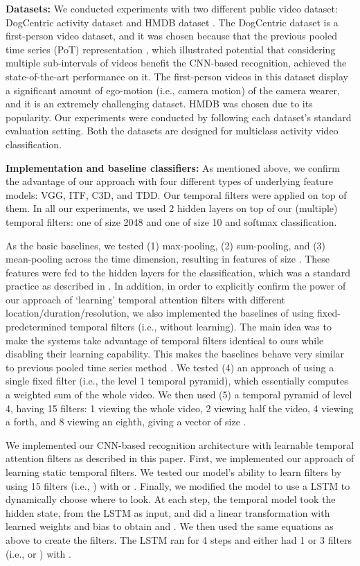 \documentclass[letterpaper]{article}
\begin{document}
{\flushleft\textbf{Datasets:} We conducted experiments with two different public video dataset: DogCentric activity dataset \cite{ryoo14dog} and HMDB dataset \cite{kuehne11}. The DogCentric dataset is a first-person video dataset, and it was chosen because that the previous pooled time series (PoT) representation \cite{ryoo15}, which illustrated potential that considering multiple sub-intervals of videos benefit the CNN-based recognition, achieved the state-of-the-art performance on it.  The first-person videos in this dataset display a significant amount of ego-motion (i.e., camera motion) of the camera wearer, and it is an extremely challenging dataset. HMDB was chosen due to its popularity. Our experiments were conducted by following each dataset's standard evaluation setting. Both the datasets are designed for multiclass activity video classification.}


{\flushleft\textbf{Implementation and baseline classifiers:} As mentioned above, we confirm the advantage of our approach with four different types of underlying feature models: VGG, ITF, C3D, and TDD. Our temporal filters were applied on top of them. In all our experiments, we used 2 hidden layers on top of our (multiple) temporal filters: one of size 2048 and one of size 10 and softmax classification.}

As the basic baselines, we tested (1) max-pooling, (2) sum-pooling, and (3) mean-pooling across the time dimension, resulting in features of size . These  features were fed to the hidden layers for the classification, which was a standard practice as described in \cite{jain14,karpathy14,simonyan14,google15,c3d}. In addition, in order to explicitly confirm the power of our approach of `learning' temporal attention filters with different location/duration/resolution, we also implemented the baselines of using fixed-predetermined temporal filters (i.e., without learning). The main idea was to make the systems take advantage of temporal filters identical to ours while disabling their learning capability. This makes the baselines behave very similar to previous pooled time series method \cite{ryoo15}. We tested (4) an approach of using a single fixed filter (i.e., the level 1 temporal pyramid), which essentially computes a weighted sum of the whole video. We then used (5) a temporal pyramid of level 4, having 15 filters: 1 viewing the whole video, 2 viewing half the video, 4 viewing a forth, and 8 viewing an eighth, giving a vector of size .

We implemented our CNN-based recognition architecture with learnable temporal attention filters as described in this paper. First, we implemented our approach of learning static temporal filters. We tested our model's ability to learn filters by using 15 filters (i.e., ) with  or . Finally, we modified the model to use a LSTM to dynamically choose where to look. At each step, the temporal model took the hidden state,  from the LSTM as input, and did a linear transformation with learned weights and bias  to obtain  and . We then used the same equations as above to create the filters. The LSTM ran for 4 steps and either had 1 or 3 filters (i.e.,  or ) with .
\end{document}
